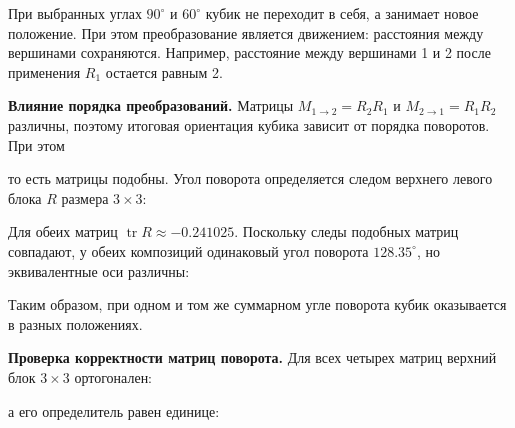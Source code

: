 \documentclass[a4paper,14pt]{extarticle}
\begin{document}
При выбранных углах $90^\circ$ и $60^\circ$ кубик не переходит в себя, а занимает новое положение. При этом преобразование является движением: расстояния между вершинами сохраняются. Например, расстояние между вершинами 1 и 2 после применения $R_1$ остается равным 2.

\textbf{Влияние порядка преобразований.} Матрицы $M_{1 \to 2}=R_2R_1$ и $M_{2 \to 1}=R_1R_2$ различны, поэтому итоговая ориентация кубика зависит от порядка поворотов. При этом

\begin{center}\end{center}

то есть матрицы подобны. Угол поворота определяется следом верхнего левого блока $R$ размера $3\times3$:

\begin{center}\end{center}

Для обеих матриц $\operatorname{tr}R \approx -0.241025$. Поскольку следы подобных матриц совпадают, у обеих композиций одинаковый угол поворота $128.35^\circ$, но эквивалентные оси различны:

\begin{center}\end{center}

Таким образом, при одном и том же суммарном угле поворота кубик оказывается в разных положениях.

\textbf{Проверка корректности матриц поворота.} Для всех четырех матриц верхний блок $3 \times 3$ ортогонален:

\begin{center}\end{center}

а его определитель равен единице:
\end{document}
